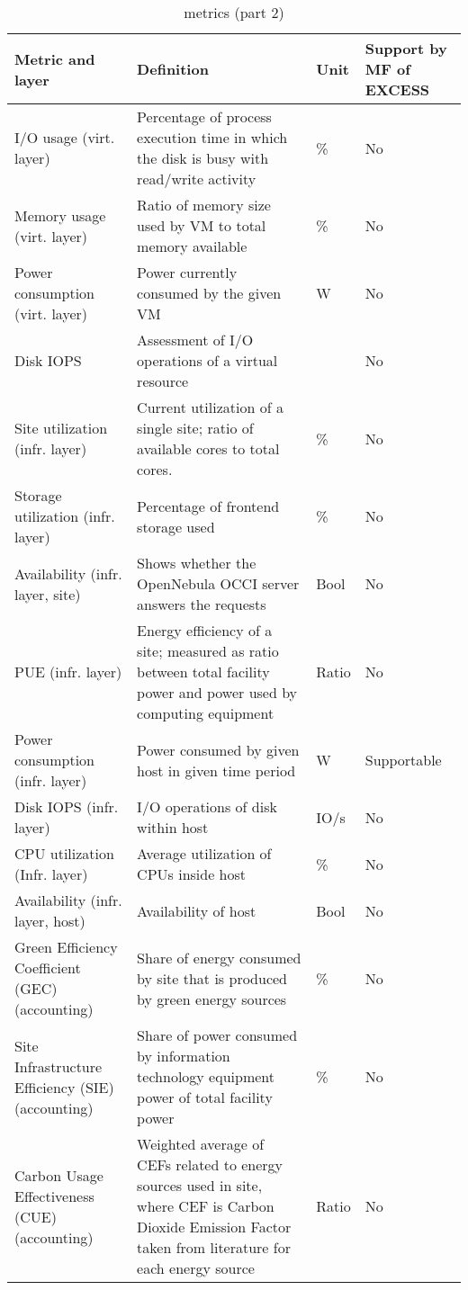\documentclass[10pt,letterpaper]{IEEEtran}
\begin{document}
\begin{table}
\caption{\ECO metrics (part 2)}
\label{e2c2}
\small
\begin{center}
\begin{tabular}{|m{1.5cm}|m{4cm}|m{0.5cm}|m{1.3cm}|}
\hline
Metric and layer & Definition & Unit & Support by MF of EXCESS \\ \hline \hline
I/O usage (virt. layer) & Percentage of process execution time in which the disk is busy with read/write activity & \% & No \\ \hline
Memory usage (virt. layer) & Ratio of memory size used by VM to total memory available & \% & No \\ \hline
Power consumption (virt. layer) & Power currently consumed by the given VM & W & No\\ \hline
Disk IOPS & Assessment of I/O operations of a virtual resource
&  & No\\ \hline
Site utilization (infr. layer) & Current utilization of a single site; ratio of available cores to total cores.
& \% & No \\ \hline
Storage utilization (infr. layer) & Percentage of frontend storage used
& \% & No \\ \hline
Availability (infr. layer, site) & Shows whether the OpenNebula OCCI server answers the requests
& Bool & No\\ \hline
PUE (infr. layer) & Energy efficiency of a site; measured as ratio between
total facility power and power used by computing equipment
& Ratio & No \\ \hline
Power consumption (infr. layer) & Power consumed by given host in given time period & W & Supportable \\ \hline
Disk IOPS (infr. layer) & I/O operations of disk within host & IO/s & No \\ \hline
CPU utilization (Infr. layer) & Average utilization of CPUs inside host
& \% & No \\ \hline
Availability (infr. layer, host) & Availability of host & Bool & No \\ \hline
Green Efficiency Coefficient (GEC) (accounting) & Share of energy consumed by site that
is produced by green energy sources & \% & No \\ \hline
Site Infrastructure Efficiency (SIE) (accounting) & Share of power consumed by information technology
equipment power of total facility power & \% & No \\ \hline
Carbon Usage Effectiveness (CUE) (accounting) & Weighted average of CEFs related to
energy sources used in site, where CEF is Carbon Dioxide Emission Factor taken from literature for
each energy source & Ratio & No \\ \hline
\end{tabular}
\end{center}
\end{table}
\end{document}
